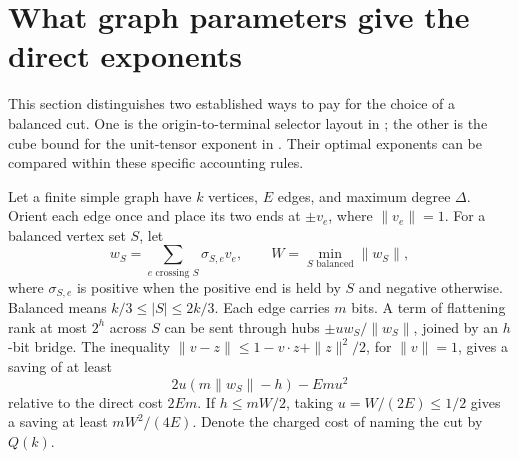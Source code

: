 \section{What graph parameters give the direct exponents}\label{sec:graph-exponents}
This section distinguishes two established ways to pay for the choice of a balanced cut. One is the origin-to-terminal selector layout in \cite[Section 2.1]{OpenAI2026}; the other is the cube bound for the unit-tensor exponent in \cite[Propositions E.9--E.10, pages 36--37]{Anthropic2026}. Their optimal exponents can be compared within these specific accounting rules.

Let a finite simple graph have $k$ vertices, $E$ edges, and maximum degree $\Delta$. Orient each edge once and place its two ends at $\pm v_e$, where $\|v_e\|=1$. For a balanced vertex set $S$, let
\[
 w_S=\sum_{e\text{ crossing }S}\sigma_{S,e}v_e,\qquad
 W=\min_{S\text{ balanced}}\|w_S\|,
\]
where $\sigma_{S,e}$ is positive when the positive end is held by $S$ and negative otherwise. Balanced means $k/3\leq|S|\leq2k/3$. Each edge carries $m$ bits. A term of flattening rank at most $2^h$ across $S$ can be sent through hubs $\pm u w_S/\|w_S\|$, joined by an $h$-bit bridge. The inequality $\|v-z\|\leq1-v\cdot z+\|z\|^2/2$, for $\|v\|=1$, gives a saving of at least
\begin{equation}\label{eq:general-hub-saving}
 2u(m\|w_S\|-h)-Emu^2
\end{equation}
relative to the direct cost $2Em$. If $h\leq mW/2$, taking $u=W/(2E)\leq1/2$ gives a saving at least $mW^2/(4E)$. Denote the charged cost of naming the cut by $Q(k)$.

